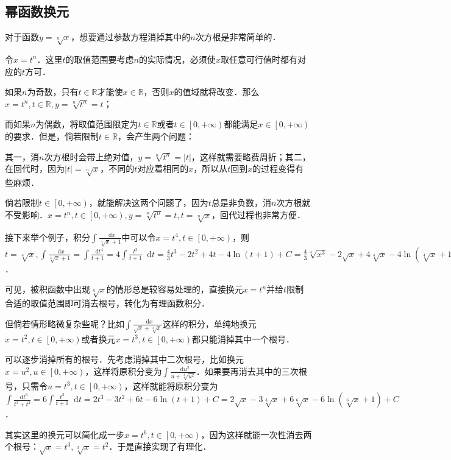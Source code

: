\documentclass{ctexbook}
\newcommand*{\dif}{\mathop{}\!\mathrm{d}}
\begin{document}
\subsection{幂函数换元}
对于函数$y=\sqrt[n]{x}$，想要通过参数方程消掉其中的$n$次方根是非常简单的．\par
令$x=t^{n}$．这里$t$的取值范围要考虑$n$的实际情况，必须使$x$取任意可行值时都有对应的$t$方可．\par
如果$n$为奇数，只有$t\in\mathbb{R}$才能使$x\in\mathbb{R}$，否则$x$的值域就将改变．那么$x=t^{n},t\in\mathbb{R},y=\sqrt[n]{t^{n}}=t$；\par
而如果$n$为偶数，将取值范围限定为$t\in\mathbb{R}$或者$t\in\left[0,+\infty\right)$都能满足$x\in\left[0,+\infty\right)$的要求．但是，倘若限制$t\in\mathbb{R}$，会产生两个问题：\par
其一，消$n$次方根时会带上绝对值，$y=\sqrt[n]{t^{n}}=|t|$，这样就需要略费周折；其二，在回代时，因为$|t|=\sqrt[n]{x}$，不同的$t$对应着相同的$x$，所以从$t$回到$x$的过程变得有些麻烦．\par
倘若限制$t\in\left[0,+\infty\right)$，就能解决这两个问题了，因为$t$总是非负数，消$n$次方根就不受影响．$x=t^{n},t\in\left[0,+\infty\right),y=\sqrt[n]{t^{n}}=t,t=\sqrt[n]{x}$，回代过程也非常方便．\par
接下来举个例子，积分$\int\frac{\dif{x}}{\sqrt[4]{x}+1}$中可以令$x=t^{4},t\in\left[0,+\infty\right)$，则$t=\sqrt[4]{x},\int\frac{\dif{x}}{\sqrt[4]{x}+1}=\int\frac{\dif{t^{4}}}{t+1}=4\int\frac{t^{3}}{t+1}\dif{t}=\frac{4}{3}t^{3}-2t^{2}+4t-4\ln{\left(t+1\right)}+C=\frac{4}{3}\sqrt[4]{x^{3}}-2\sqrt{x}+4\sqrt[4]{x}-4\ln{\left(\sqrt[4]{x}+1\right)}+C$．\par
可见，被积函数中出现$\sqrt[n]{x}$的情形总是较容易处理的，直接换元$x=t^{n}$并给$t$限制合适的取值范围即可消去根号，转化为有理函数积分．\par
但倘若情形略微复杂些呢？比如$\int\frac{\dif{x}}{\sqrt{x}+\sqrt[3]{x}}$这样的积分，单纯地换元$x=t^{2},t\in\left[0,+\infty\right)$或者换元$x=t^{3},t\in\left[0,+\infty\right)$都只能消掉其中一个根号．\par
可以逐步消掉所有的根号．先考虑消掉其中二次根号，比如换元$x=u^{2},u\in\left[0,+\infty\right)$，这样将原积分变为$\int\frac{\dif{u^{2}}}{u+\sqrt[3]{u^{2}}}$．如果要再消去其中的三次根号，只需令$u=t^{3},t\in\left[0,+\infty\right)$，这样就能将原积分变为$\int\frac{\dif{t^{6}}}{t^{3}+t^{2}}=6\int\frac{t^{3}}{t+1}\dif{t}=2t^{3}-3t^{2}+6t-6\ln{\left(t+1\right)}+C=2\sqrt{x}-3\sqrt[3]{x}+6\sqrt[6]{x}-6\ln{\left(\sqrt[6]{x}+1\right)}+C$．\par
其实这里的换元可以简化成一步$x=t^{6},t\in\left[0,+\infty\right)$，因为这样就能一次性消去两个根号：$\sqrt{x}=t^{3},\sqrt[3]{x}=t^{2}$．于是直接实现了有理化．\par
\end{document}
